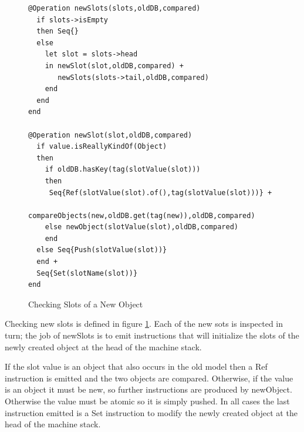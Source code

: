 %
\begin{figure}
\hfill{}\begin{lstlisting}
@Operation newSlots(slots,oldDB,compared)      
  if slots->isEmpty
  then Seq{}
  else 
    let slot = slots->head
    in newSlot(slot,oldDB,compared) +
       newSlots(slots->tail,oldDB,compared)
    end
  end
end
  
@Operation newSlot(slot,oldDB,compared)
  if value.isReallyKindOf(Object)
  then 
    if oldDB.hasKey(tag(slotValue(slot)))
    then 
     Seq{Ref(slotValue(slot).of(),tag(slotValue(slot)))} +
      compareObjects(new,oldDB.get(tag(new)),oldDB,compared)
    else newObject(slotValue(slot),oldDB,compared)
    end
  else Seq{Push(slotValue(slot))}
  end +
  Seq{Set(slotName(slot))}
end
\end{lstlisting}\hfill{}

\caption{Checking Slots of a New Object\label{fig:Checking-Slots-of}}

\end{figure}


Checking new slots is defined in figure \ref{fig:Checking-Slots-of}.
Each of the new sots is inspected in turn; the job of newSlots is
to emit instructions that will initialize the slots of the newly created
object at the head of the machine stack.

If the slot value is an object that also occurs in the old model then
a Ref instruction is emitted and the two objects are compared. Otherwise,
if the value is an object it must be new, so further instructions
are produced by newObject. Otherwise the value must be atomic so it
is simply pushed. In all cases the last instruction emitted is a Set
instruction to modify the newly created object at the head of the
machine stack.

